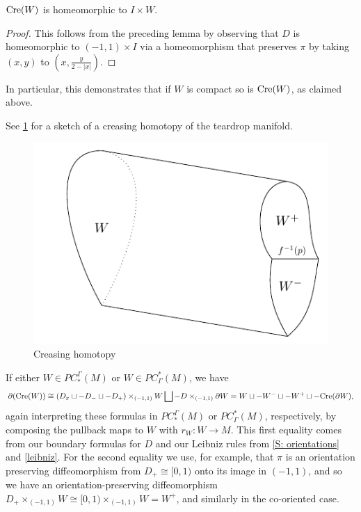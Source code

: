 \begin{corollary}
$\mathrm{Cre}(W)$ is homeomorphic to $I \times W$.
\end{corollary}
\begin{proof}
This follows from the preceding lemma by observing that $D$ is homeomorphic to $(-1,1) \times I$ via a homeomorphism that preserves $\pi$ by taking $(x,y)$ to $\left(x, \frac{y}{2-|x|}\right)$.
\end{proof}


In particular, this demonstrates that if $W$ is compact so is $\mathrm{Cre}(W)$, as claimed above.

See \cref{F: creasing} for a sketch of a creasing homotopy of the teardrop manifold.



\begin{figure}
	\includegraphics{figures/creasing2.pdf}
	\caption{Creasing homotopy}
	\label{F: creasing}
\end{figure}



If either $W \in PC^\Gamma_*(M)$ or $W \in PC_\Gamma^*(M)$, we have
\begin{equation}\label{E: bd crease}
\partial(\mathrm{Cre}(W))\cong(D_x\sqcup -D_-\sqcup -D_+)\times_{(-1,1)} W \bigsqcup -D\times_{(-1,1)}\partial W = W\sqcup -W^-\sqcup -W^+\sqcup -\mathrm{Cre}(\partial W),
\end{equation}
again interpreting these formulas in $PC^\Gamma_*(M)$ or $PC_\Gamma^*(M)$, respectively, by composing the pullback maps to $W$ with $r_W \colon W \to M$. This first equality comes from our boundary formulas for $D$ and our Leibniz rules from \cref{S: orientations} and \cref{leibniz}. For the second equality we use, for example, that $\pi$ is an orientation preserving diffeomorphism from $D_+ \cong [0,1)$ onto its image in $(-1,1)$, and so we have an orientation-preserving diffeomorphism $D_+\times_{(-1,1)} W \cong [0,1)\times_{(-1,1)} W = W^+$, and similarly in the co-oriented case.


